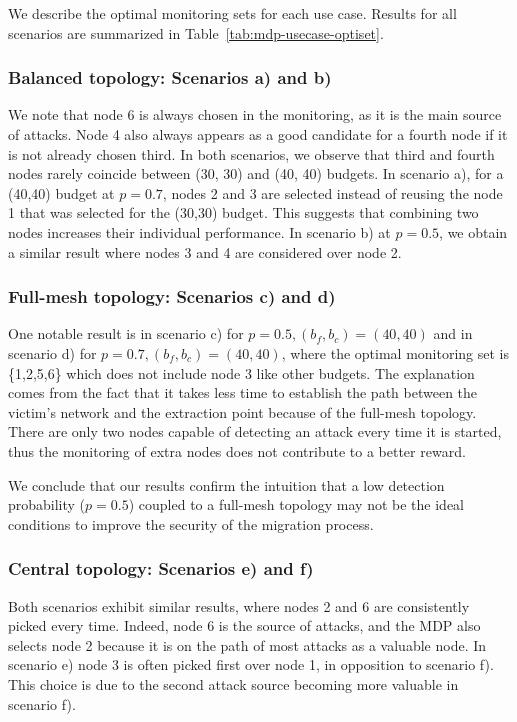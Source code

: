 We describe the optimal monitoring sets for each use case.
Results for all scenarios are summarized in Table~\ref{tab:mdp-usecase-optiset}. 

\subsubsection*{Balanced topology: Scenarios a) and b)}
We note that node 6 is always chosen in the monitoring, as it is the main source of attacks.
Node 4 also always appears as a good candidate for a fourth node if it is not already chosen third.
In both scenarios, we observe that third and fourth nodes rarely coincide between (30, 30) and (40, 40) budgets.
In scenario a), for a (40,40) budget at $p=0.7$,  nodes 2 and 3 are selected instead of reusing the node 1 that was selected for the (30,30) budget.
This suggests that combining two nodes increases their individual performance.
In scenario b) at $p=0.5$, we obtain a similar result where nodes 3 and 4 are considered over node 2.


\subsubsection*{Full-mesh topology: Scenarios c) and d)}
One notable result is in scenario c) for $p=0.5,  (b_f,b_c) = (40,40)$ and in scenario d) for $p=0.7,  (b_f,b_c) = (40,40)$, where the optimal monitoring set is \{1,2,5,6\} which does not include node 3 like other budgets.  The explanation comes from the fact that it takes less time to establish the path between the victim's network and the extraction point because of the full-mesh topology. There are only two nodes capable of detecting an attack every time it is started, thus the monitoring of extra nodes does not contribute to a better reward.

We conclude that our results confirm the intuition that a low detection probability ($p=0.5$) coupled to a full-mesh topology may not be the ideal conditions to improve the security of the migration process. 


\subsubsection*{Central topology: Scenarios e) and f)}
Both scenarios exhibit similar results, where nodes 2 and 6 are consistently picked every time.
Indeed, node 6 is the source of attacks, and the MDP also selects node 2 because it is on the path of most attacks as a valuable node.
In scenario e) node 3 is often picked first over node 1, in opposition to scenario f).
This choice is due to the second attack source becoming more valuable in scenario f).

